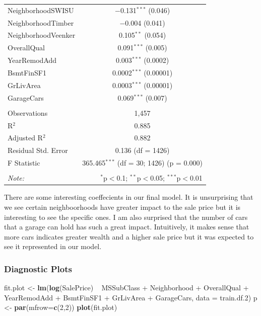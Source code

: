 \documentclass[]{article}
\newenvironment{Shaded}{\begin{snugshade}}{\end{snugshade}}
\newcommand{\KeywordTok}[1]{\textcolor[rgb]{0.13,0.29,0.53}{\textbf{{#1}}}}
\newcommand{\DataTypeTok}[1]{\textcolor[rgb]{0.13,0.29,0.53}{{#1}}}
\newcommand{\DecValTok}[1]{\textcolor[rgb]{0.00,0.00,0.81}{{#1}}}
\newcommand{\FloatTok}[1]{\textcolor[rgb]{0.00,0.00,0.81}{{#1}}}
\newcommand{\StringTok}[1]{\textcolor[rgb]{0.31,0.60,0.02}{{#1}}}
\newcommand{\NormalTok}[1]{{#1}}
\begin{document}
\begin{table}[!htbp]
\begin{tabular}{@{\extracolsep{5pt}}lc}
  NeighborhoodSWISU & $-$0.131$^{***}$ (0.046) \\ 
  NeighborhoodTimber & $-$0.004 (0.041) \\ 
  NeighborhoodVeenker & 0.105$^{**}$ (0.054) \\ 
  OverallQual & 0.091$^{***}$ (0.005) \\ 
  YearRemodAdd & 0.003$^{***}$ (0.0002) \\ 
  BsmtFinSF1 & 0.0002$^{***}$ (0.00001) \\ 
  GrLivArea & 0.0003$^{***}$ (0.00001) \\ 
  GarageCars & 0.069$^{***}$ (0.007) \\ 
 \hline \\[-1.8ex] 
Observations & 1,457 \\ 
R$^{2}$ & 0.885 \\ 
Adjusted R$^{2}$ & 0.882 \\ 
Residual Std. Error & 0.136 (df = 1426) \\ 
F Statistic & 365.465$^{***}$ (df = 30; 1426)  (p = 0.000) \\ 
\hline 
\hline \\[-1.8ex] 
\textit{Note:}  & \multicolumn{1}{r}{$^{*}$p$<$0.1; $^{**}$p$<$0.05; $^{***}$p$<$0.01} \\ 
\end{tabular} 
\end{table}

There are some interesting coeffecients in our final model. It is
unsurprising that we see certain neighboorhoods have greater impact to
the sale price but it is interesting to see the specific ones. I am also
surprised that the number of cars that a garage can hold has such a
great impact. Intuitively, it makes sense that more cars indicates
greater wealth and a higher sale price but it was expected to see it
represented in our model.

\newpage

\subsubsection{Diagnostic Plots}\label{diagnostic-plots-1}

\begin{Shaded}
\begin{Highlighting}[]
\NormalTok{fit.plot <-}\StringTok{ }\KeywordTok{lm}\NormalTok{(}\KeywordTok{log}\NormalTok{(SalePrice) ~}\StringTok{ }\NormalTok{MSSubClass +}\StringTok{ }\NormalTok{Neighborhood +}\StringTok{ }
\StringTok{            }\NormalTok{OverallQual +}\StringTok{ }\NormalTok{YearRemodAdd +}\StringTok{ }\NormalTok{BsmtFinSF1 +}\StringTok{ }
\StringTok{            }\NormalTok{GrLivArea +}\StringTok{ }\NormalTok{GarageCars, }\DataTypeTok{data =} \NormalTok{train.df}\FloatTok{.2}\NormalTok{)}
\NormalTok{p <-}\StringTok{ }\KeywordTok{par}\NormalTok{(}\DataTypeTok{mfrow=}\KeywordTok{c}\NormalTok{(}\DecValTok{2}\NormalTok{,}\DecValTok{2}\NormalTok{))}
\KeywordTok{plot}\NormalTok{(fit.plot)}
\end{Highlighting}
\end{Shaded}
\end{document}
